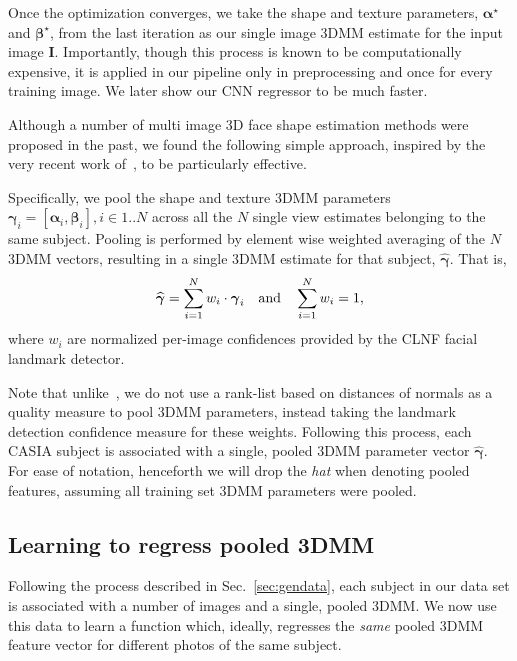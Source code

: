 \documentclass[10pt,twocolumn,letterpaper]{article}
\def\mbf#1{\mathbf{#1}}
\newcommand{\minisection}[1]{\vspace{1mm}\noindent{\bf #1}}
\begin{document}
Once the optimization converges, we take the shape and texture parameters, $\boldsymbol{\alpha}^\star$ and $\boldsymbol{\beta}^\star$, from the last iteration as our single image 3DMM estimate for the input image $\mbf{I}$. Importantly, though this process is known to be computationally expensive, it is applied in our pipeline only in preprocessing and once for every training image. We later show our CNN regressor to be much faster. 

\minisection{Multi image 3DMM fitting.} Although a number of multi image 3D face shape estimation methods were proposed in the past, we found the following simple approach, inspired by the very recent work of~\cite{Piotraschke_2016_CVPR}, to be particularly effective. 

Specifically, we pool the shape and texture 3DMM parameters $\boldsymbol{\gamma}_i=[\boldsymbol{\alpha}_i,\boldsymbol{\beta}_i], i\in 1..N$ across all the $N$ single view estimates belonging to the same subject. Pooling is performed by element wise weighted averaging of the $N$ 3DMM vectors, resulting in a single 3DMM estimate for that subject, $\widehat{\boldsymbol{\gamma}}$. That is,
\begin{equation}
\widehat{\boldsymbol{\gamma}} = \sum_{i=1}^N w_i\cdot\boldsymbol{\gamma}_i \quad \textnormal{and} \quad \sum_{i=1}^N w_i=1,
\label{eq:pooling}
\end{equation}
where $w_i$ are normalized per-image confidences provided by the CLNF facial landmark detector. 

Note that unlike~\cite{Piotraschke_2016_CVPR}, we do not use a rank-list based on distances of normals as a quality measure to pool 3DMM parameters, instead taking the landmark detection confidence measure for these weights. Following this process, each CASIA subject is associated with a single, pooled 3DMM parameter vector $\widehat{\boldsymbol{\gamma}}$. For ease of notation, henceforth we will drop the {\em hat} when denoting pooled features, assuming all training set 3DMM parameters were pooled. 

\subsection{Learning to regress pooled 3DMM} \label{sec:learning}
Following the process described in Sec.~\ref{sec:gendata}, each subject in our data set is associated with a number of images and a single, pooled 3DMM. We now use this data to learn a function which, ideally, regresses the \emph{same} pooled 3DMM feature vector for different photos of the same subject. 
\end{document}
